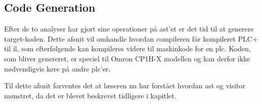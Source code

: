 \subsection{Code Generation}\label{ssec:codegen}
Efter de to analyser har gjort sine operationer på \gls{ast}'et er det tid til at generere target-koden. Dette afsnit vil omhandle hvordan compileren får kompileret PLC+ til \gls{il}, som efterfølgende kan kompileres videre til maskinkode for en \gls{plc}. Koden, som bliver genereret, er speciel til Omron CP1H-X modellen og kan derfor ikke nødvendigvis køre på andre \gls{plc}'er.

Til dette afsnit forventes det at læseren nu har forstået hvordan \acrlong{ast} og visitor mønstret, da det er blevet beskrevet tidligere i kapitlet. 

\bigskip